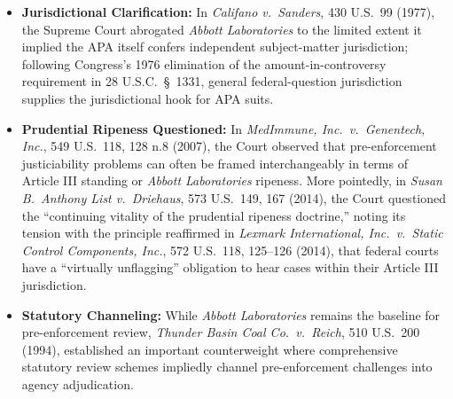\documentclass[12pt]{article}
\begin{document}
\begin{itemize}

\item \textbf{Jurisdictional Clarification:} In \textit{Califano v.\ Sanders}, 430 U.S.\ 99 (1977), the Supreme Court abrogated \textit{Abbott Laboratories} to the limited extent it implied the APA itself confers independent subject-matter jurisdiction; following Congress's 1976 elimination of the amount-in-controversy requirement in 28 U.S.C.\ \S~1331, general federal-question jurisdiction supplies the jurisdictional hook for APA suits.

\item \textbf{Prudential Ripeness Questioned:} In \textit{MedImmune, Inc.\ v.\ Genentech, Inc.}, 549 U.S.\ 118, 128 n.8 (2007), the Court observed that pre-enforcement justiciability problems can often be framed interchangeably in terms of Article III standing or \textit{Abbott Laboratories} ripeness. More pointedly, in \textit{Susan B.\ Anthony List v.\ Driehaus}, 573 U.S.\ 149, 167 (2014), the Court questioned the ``continuing vitality of the prudential ripeness doctrine,'' noting its tension with the principle reaffirmed in \textit{Lexmark International, Inc.\ v.\ Static Control Components, Inc.}, 572 U.S.\ 118, 125--126 (2014), that federal courts have a ``virtually unflagging'' obligation to hear cases within their Article III jurisdiction.

\item \textbf{Statutory Channeling:} While \textit{Abbott Laboratories} remains the baseline for pre-enforcement review, \textit{Thunder Basin Coal Co.\ v.\ Reich}, 510 U.S.\ 200 (1994), established an important counterweight where comprehensive statutory review schemes impliedly channel pre-enforcement challenges into agency adjudication.

\end{itemize}
\end{document}
